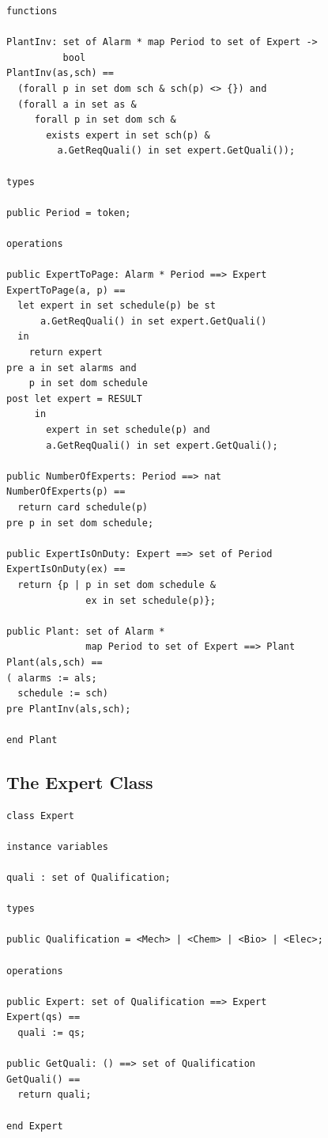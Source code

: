 \begin{lstlisting}
functions

PlantInv: set of Alarm * map Period to set of Expert ->
          bool
PlantInv(as,sch) ==
  (forall p in set dom sch & sch(p) <> {}) and
  (forall a in set as &
     forall p in set dom sch &
       exists expert in set sch(p) &
         a.GetReqQuali() in set expert.GetQuali());

types

public Period = token;

operations

public ExpertToPage: Alarm * Period ==> Expert
ExpertToPage(a, p) ==
  let expert in set schedule(p) be st
      a.GetReqQuali() in set expert.GetQuali()
  in
    return expert
pre a in set alarms and
    p in set dom schedule
post let expert = RESULT
     in
       expert in set schedule(p) and
       a.GetReqQuali() in set expert.GetQuali();

public NumberOfExperts: Period ==> nat
NumberOfExperts(p) ==
  return card schedule(p)
pre p in set dom schedule;

public ExpertIsOnDuty: Expert ==> set of Period
ExpertIsOnDuty(ex) ==
  return {p | p in set dom schedule &
              ex in set schedule(p)};

public Plant: set of Alarm *
              map Period to set of Expert ==> Plant
Plant(als,sch) ==
( alarms := als;
  schedule := sch)
pre PlantInv(als,sch);

end Plant
\end{lstlisting}

\subsection{The Expert Class}

\begin{lstlisting}
class Expert

instance variables

quali : set of Qualification;

types

public Qualification = <Mech> | <Chem> | <Bio> | <Elec>;

operations

public Expert: set of Qualification ==> Expert
Expert(qs) ==
  quali := qs;

public GetQuali: () ==> set of Qualification
GetQuali() ==
  return quali;

end Expert
\end{lstlisting}

